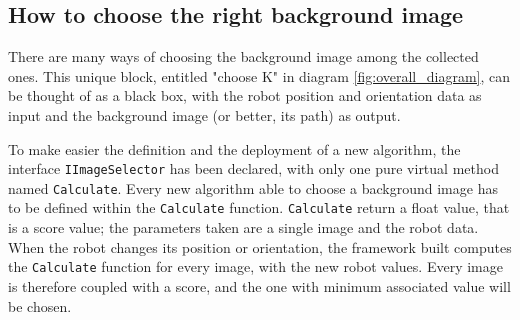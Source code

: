 


\subsection{How to choose the right background image}
\label{sub:howbackgroundimage}

There are many ways of choosing the background image among the collected ones. This unique
block, entitled "choose K" in diagram \ref{fig:overall_diagram}, can be thought of as a
black box, with the robot position and orientation data as input and the background image
(or better, its path) as output.
%

%
To make easier the definition and the deployment of a new algorithm, the interface
\texttt{IImageSelector} has been declared, with only one pure virtual method named
\texttt{Calculate}. Every new algorithm able to choose a background image has to be defined
within the \texttt{Calculate} function.
\texttt{Calculate} return a float value, that is a score value; the parameters taken are a
single image and the robot data. When the robot changes its position or orientation, the
framework built computes the \texttt{Calculate} function for every image, with the new robot
values. Every image is therefore coupled with a score, and the one with minimum associated value
will be chosen.
%


